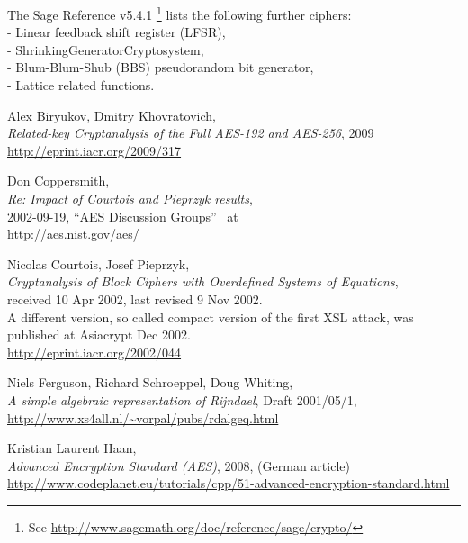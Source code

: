 The Sage Reference v5.4.1%
\footnote{
See \url{http://www.sagemath.org/doc/reference/sage/crypto/}
}
lists the following further ciphers:\\ 
- Linear feedback shift register (LFSR),\\
- ShrinkingGeneratorCryptosystem,\\
- Blum-Blum-Shub (BBS) pseudorandom bit generator,\\
- Lattice related functions.




\newpage
\begin{thebibliography}{99999}

 
	Alex Biryukov, Dmitry Khovratovich, \\
	{\em Related-key Cryptanalysis of the Full AES-192 and AES-256},
	2009 \\
	\url{http://eprint.iacr.org/2009/317}

  
        Don Coppersmith, \\
        {\em Re: Impact of Courtois and Pieprzyk results}, \\
        2002-09-19, ``AES Discussion Groups''~ at \\
        \url{http://aes.nist.gov/aes/}

  
        Nicolas Courtois, Josef Pieprzyk, \\
        {\em Cryptanalysis of Block Ciphers with Overdefined Systems
             of Equations}, \\
        received 10 Apr 2002, last revised 9 Nov 2002.\\
        A different version, so called compact version of the first XSL attack,
        was published at Asiacrypt Dec 2002. \\
        \url{http://eprint.iacr.org/2002/044}

  
       Niels Ferguson, Richard Schroeppel, Doug Whiting, \\
       {\em A simple algebraic representation of Rijndael}, 
       Draft 2001/05/1, \\
       \url{http://www.xs4all.nl/~vorpal/pubs/rdalgeq.html}

  
       Kristian Laurent Haan, \\
       {\em Advanced Encryption Standard (AES)},
       2008, (German article)\\
       \url{http://www.codeplanet.eu/tutorials/cpp/51-advanced-encryption-standard.html}


\end{thebibliography}
